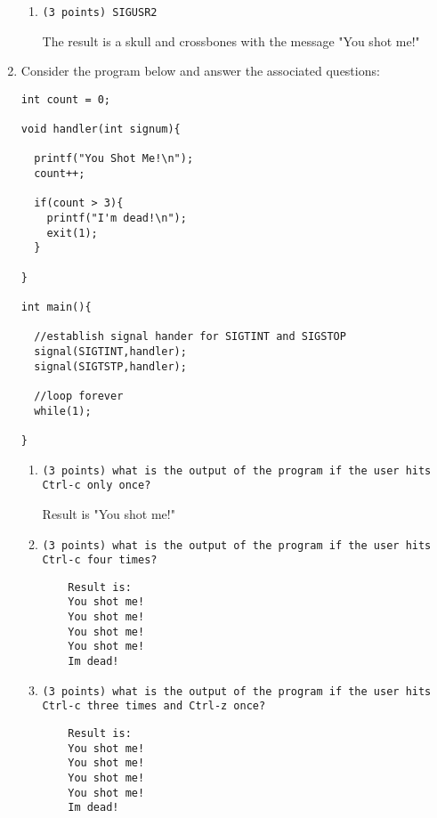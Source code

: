 \documentclass{article}[9pt]
\newenvironment{answerfont}{\fontfamily{qhv}\selectfont}{\par}
\newenvironment{myanswer}{\begin{mdframed}\begin{answerfont}}{\end{answerfont}\end{mdframed}}
\begin{document}
\begin{enumerate}
\begin{enumerate}
  \item \texttt{(3 points) SIGUSR2}

    \begin{myanswer}
    The result is a skull and crossbones with the message "You shot me!"
    \end{myanswer}
  \end{enumerate}

\item Consider the program below and answer the associated questions:
\begin{verbatim}
int count = 0;

void handler(int signum){

  printf("You Shot Me!\n");
  count++;

  if(count > 3){
    printf("I'm dead!\n");
    exit(1);
  }

}

int main(){

  //establish signal hander for SIGTINT and SIGSTOP
  signal(SIGTINT,handler);
  signal(SIGTSTP,handler);

  //loop forever
  while(1);

}
\end{verbatim}

\begin{enumerate}
  \item \texttt{(3 points) what is the output of the program if the user hits Ctrl-c only once?}

    \begin{myanswer}
    Result is "You shot me!"
    \end{myanswer}

  \item \texttt{(3 points) what is the output of the program if the user hits Ctrl-c four times?}

    \begin{myanswer}
    \begin{verbatim}
    Result is:
    You shot me!
    You shot me!
    You shot me!
    You shot me!
    Im dead!
    \end{verbatim}
    \end{myanswer}

  \item \texttt{(3 points) what is the output of the program if the user hits Ctrl-c three times and Ctrl-z once?}

    \begin{myanswer}
    \begin {verbatim}
    Result is:
    You shot me!
    You shot me!
    You shot me!
    You shot me!
    Im dead!
    \end{verbatim}
    \end{myanswer}
\end{enumerate}


\end{enumerate}
\end{document}
